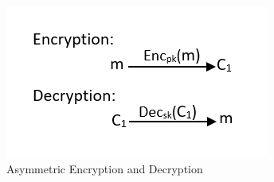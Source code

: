 \begin{figure}[!h]
\centering
\includegraphics[scale=0.8]{figures/asym.PNG}
\caption{Asymmetric Encryption and Decryption}
\label{fig:Asymmetric Encryption}
\end{figure}